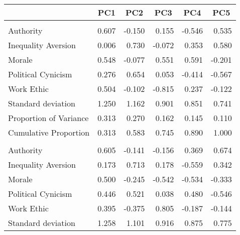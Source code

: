 
\begin{tabular}{lrrrrr}
\toprule
  & \multicolumn{1}{c}{PC1} & \multicolumn{1}{c}{PC2} & \multicolumn{1}{c}{PC3} & \multicolumn{1}{c}{PC4} & \multicolumn{1}{c}{PC5}\\
\midrule
\addlinespace[0.3em]
\multicolumn{6}{l}{\textbf{Age 33}}\\
\hline
\hspace{1em}Authority & 0.607 & -0.150 & 0.155 & -0.546 & 0.535\\
\hspace{1em}Inequality Aversion & 0.006 & 0.730 & -0.072 & 0.353 & 0.580\\
\hspace{1em}Morale & 0.548 & -0.077 & 0.551 & 0.591 & -0.201\\
\hspace{1em}Political Cynicism & 0.276 & 0.654 & 0.053 & -0.414 & -0.567\\
\hspace{1em}Work Ethic & 0.504 & -0.102 & -0.815 & 0.237 & -0.122\\
\midrule
\hspace{1em}Standard deviation & 1.250 & 1.162 & 0.901 & 0.851 & 0.741\\
\hspace{1em}Proportion of Variance & 0.313 & 0.270 & 0.162 & 0.145 & 0.110\\
\hspace{1em}Cumulative Proportion & 0.313 & 0.583 & 0.745 & 0.890 & 1.000\\
\addlinespace[0.3em]
\multicolumn{6}{l}{\textbf{Age 42}}\\
\hline
\hspace{1em}Authority & 0.605 & -0.141 & -0.156 & 0.369 & 0.674\\
\hspace{1em}Inequality Aversion & 0.173 & 0.713 & 0.178 & -0.559 & 0.342\\
\hspace{1em}Morale & 0.500 & -0.245 & -0.542 & -0.534 & -0.333\\
\hspace{1em}Political Cynicism & 0.446 & 0.521 & 0.038 & 0.480 & -0.546\\
\hspace{1em}Work Ethic & 0.395 & -0.375 & 0.805 & -0.187 & -0.144\\
\midrule
\hspace{1em}Standard deviation & 1.258 & 1.101 & 0.916 & 0.875 & 0.775\\

\end{tabular}
